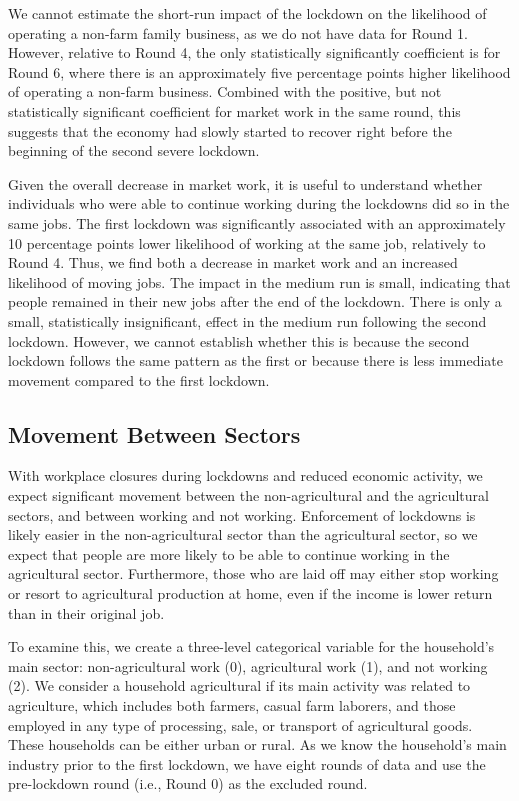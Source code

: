 \documentclass{wber}
\begin{document}
We cannot estimate the short-run impact of the lockdown on the
likelihood of operating a non-farm family business, as we do not have
data for Round 1. However, relative to Round 4, the only statistically
significantly coefficient is for Round 6, where there is an
approximately five percentage points higher likelihood of operating a
non-farm business. Combined with the positive, but not statistically
significant coefficient for market work in the same round, this suggests
that the economy had slowly started to recover right before the
beginning of the second severe lockdown.

Given the overall decrease in market work, it is useful to understand
whether individuals who were able to continue working during the
lockdowns did so in the same jobs. The first lockdown was significantly
associated with an approximately 10 percentage points lower likelihood
of working at the same job, relatively to Round 4. Thus, we find both a
decrease in market work and an increased likelihood of moving jobs. The
impact in the medium run is small, indicating that people remained in
their new jobs after the end of the lockdown. There is only a small,
statistically insignificant, effect in the medium run following the
second lockdown. However, we cannot establish whether this is because
the second lockdown follows the same pattern as the first or because
there is less immediate movement compared to the first lockdown.

\subsection{Movement Between Sectors}\label{movement-between-sectors}

With workplace closures during lockdowns and reduced economic activity,
we expect significant movement between the non-agricultural and the
agricultural sectors, and between working and not working. Enforcement
of lockdowns is likely easier in the non-agricultural sector than the
agricultural sector, so we expect that people are more likely to be able
to continue working in the agricultural sector. Furthermore, those who
are laid off may either stop working or resort to agricultural
production at home, even if the income is lower return than in their
original job.

To examine this, we create a three-level categorical variable for the
household's main sector: non-agricultural work (0), agricultural work
(1), and not working (2). We consider a household agricultural if its
main activity was related to agriculture, which includes both farmers,
casual farm laborers, and those employed in any type of processing,
sale, or transport of agricultural goods. These households can be either
urban or rural. As we know the household's main industry prior to the
first lockdown, we have eight rounds of data and use the pre-lockdown
round (i.e., Round 0) as the excluded round.
\end{document}
